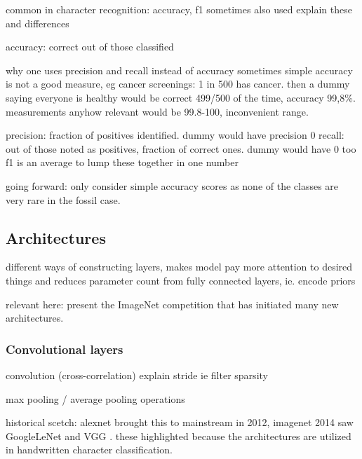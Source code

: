 \documentclass{article}
\begin{document}
common in character recognition: accuracy, f1 sometimes also used 
explain these and differences 

accuracy: correct out of those classified

why one uses precision and recall instead of accuracy
sometimes simple accuracy is not a good measure, eg cancer screenings: 1 in 500 has cancer.
then a dummy saying everyone is healthy would be correct 499/500 of the time, accuracy
99,8\%. measurements anyhow relevant would be 99.8-100, inconvenient range.

precision: fraction of positives identified. dummy would have precision 0
recall: out of those noted as positives, fraction of correct ones. dummy would have 0 too 
f1 is an average to lump these together in one number 

going forward: only consider simple accuracy scores as none of the classes are very rare 
in the fossil case.

\subsection{Architectures}

different ways of constructing layers, makes model pay more attention to desired things 
and reduces parameter count from fully connected layers, ie. encode priors \cite{alexnet}

relevant here: present the ImageNet competition that has initiated many new architectures.

\subsubsection{Convolutional layers}



convolution (cross-correlation)
explain stride ie filter sparsity

max pooling / average pooling operations

historical scetch: alexnet \cite{alexnet} brought this to mainstream in 2012, imagenet 2014 saw GoogleLeNet \cite{googlelenet} and VGG \cite{vgg}.
these highlighted because the architectures are utilized in handwritten character classification.
\end{document}
